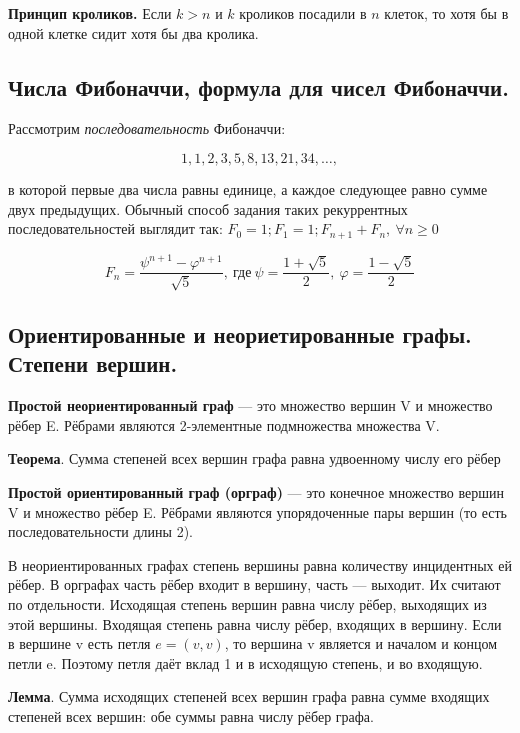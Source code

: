 \documentclass[a4paper, 10pt]{article}
\begin{document}
\textbf{Принцип кроликов.} Если $k > n$ и $k$ кроликов посадили в $n$ клеток, то хотя бы в одной клетке сидит хотя бы два кролика.

\subsection{Числа Фибоначчи, формула для чисел Фибоначчи.}


Рассмотрим \textit{последовательность} Фибоначчи:

$$1, 1, 2, 3, 5, 8, 13, 21, 34, \dots, $$

в которой первые два числа равны единице, а каждое следующее равно сумме двух предыдущих. Обычный способ задания таких рекуррентных последовательностей выглядит так: $F_0 = 1; F_1 = 1; F_{n + 1} + F_n, \  \forall n \geqslant 0$

$$F_n = \frac{\psi^{n + 1} - \varphi^{n + 1}}{\sqrt{5}}, \ \text{где} \ \psi = \frac{1 + \sqrt{5}}{2}, \ \varphi = \frac{1 - \sqrt{5}}{2}$$



\subsection{Ориентированные и неориетированные графы. Степени вершин.}

\textbf{Простой неориентированный граф} — это множество вершин V и множество рёбер E. Рёбрами являются 2-элементные подмножества множества V.


\textbf{Теорема}. Сумма степеней всех вершин графа равна удвоенному числу его рёбер

\textbf{Простой ориентированный граф
(орграф)} — это конечное множество вершин V и множество рёбер E. Рёбрами являются упорядоченные пары вершин (то есть последовательности длины 2).

В неориентированных графах степень вершины равна количеству инцидентных ей рёбер. В орграфах часть рёбер входит в вершину, часть — выходит. Их считают по отдельности. Исходящая степень вершин равна числу рёбер, выходящих из этой вершины. Входящая степень равна числу рёбер, входящих в вершину. Если в вершине v
есть петля $e = (v, v)$, то вершина v является и началом и концом петли e. Поэтому петля даёт вклад 1 и в исходящую степень, и во входящую.

\textbf{Лемма}. Сумма исходящих степеней всех вершин графа равна сумме входящих степеней всех вершин: обе суммы равна числу рёбер графа.
\end{document}
